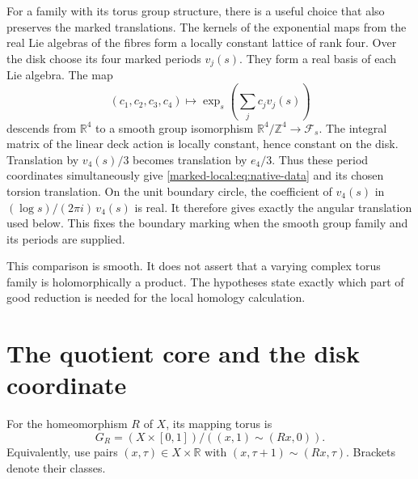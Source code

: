 For a family with its torus group structure, there is a useful choice
that also preserves the marked translations. The kernels of the
exponential maps from the real Lie algebras of the fibres form a locally
constant lattice of rank four. Over the disk choose its four marked
periods $v_j(s)$. They form a real basis of each Lie algebra. The map
\[
 (c_1,c_2,c_3,c_4)\longmapsto
       \exp_s\!\left(\sum_jc_jv_j(s)\right)
\]
descends from $\mathbb R^4$ to a smooth group isomorphism
$\mathbb R^4/\mathbb Z^4\to\mathcal F_s$.
The integral matrix of the linear deck action is locally constant,
hence constant on the disk. Translation by $v_4(s)/3$ becomes
translation by $e_4/3$. Thus these period coordinates simultaneously
give \eqref{marked-local:eq:native-data} and its chosen torsion translation.
On the unit boundary circle, the coefficient of $v_4(s)$ in
$(\log s)/(2\pi i)\,v_4(s)$ is real. It therefore gives exactly
the angular translation used below. This fixes the boundary marking
when the smooth group family and its periods are supplied.

This comparison is smooth. It does not assert that a varying complex
torus family is holomorphically a product. The hypotheses state exactly
which part of good reduction is needed for the local homology calculation.

\section{The quotient core and the disk coordinate}

For the homeomorphism $R$ of $X$, its mapping torus is
\[
 G_R=(X\times[0,1])/((x,1)\sim(Rx,0)).
\]
Equivalently, use pairs $(x,\tau)\in X\times\mathbb R$ with
$(x,\tau+1)\sim(Rx,\tau)$. Brackets denote their classes.

